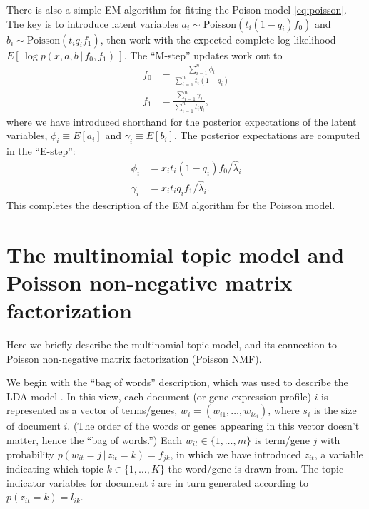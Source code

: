 \documentclass[final]{siamart171218}
\begin{document}
There is also a simple EM algorithm for fitting the Poison model
\eqref{eq:poisson}. The key is to introduce latent variables $a_i \sim
\mathrm{Poisson}(t_i (1-q_i) f_0)$ and $b_i \sim \mathrm{Poisson}(t_i
q_i f_1)$, then work with the expected complete log-likelihood $E[\,\log
  p(x, a, b \,|\, f_0, f_1)\,]$. The ``M-step'' updates work out to
\begin{align}
f_0 &= \frac{\sum_{i=1}^n \phi_i}{\sum_{i=1}^n t_i(1-q_i)} \\
f_1 &= \frac{\sum_{i=1}^n \gamma_i}{\sum_{i=1}^n t_i q_i},
\end{align}
where we have introduced shorthand for the posterior expectations of
the latent variables, $\phi_i \equiv E[a_i]$ and $\gamma_i \equiv
E[b_i]$. The posterior expectations are computed in the ``E-step'':
\begin{align}
\phi_i   &= x_i t_i (1 - q_i) f_0 / \hat{\lambda}_i \\
\gamma_i &= x_i t_i q_i f_1 / \hat{\lambda}_i.
\end{align}
This completes the description of the EM algorithm for the Poisson
model.

\section{The multinomial topic model and Poisson non-negative matrix
  factorization}

Here we briefly describe the multinomial topic model, and its
connection to Poisson non-negative matrix factorization (Poisson NMF).

We begin with the ``bag of words'' description, which was used to
describe the LDA model \cite{blei-2003}. In this view, each document
(or gene expression profile) $i$ is represented as a vector of
terms/genes, $w_i = (w_{i1}, \ldots, w_{is_i})$, where $s_i$ is the
size of document $i$. (The order of the words or genes appearing in
this vector doesn't matter, hence the ``bag of words.'') Each $w_{it}
\in \{1, \ldots, m\}$ is term/gene $j$ with probability
$p(w_{it} = j \,|\, z_{it} = k) = f_{jk}$, in which we have introduced
$z_{it}$, a variable indicating which topic $k \in \{1, \ldots, K\}$
the word/gene is drawn from. The topic indicator variables for
document $i$ are in turn generated according to $p(z_{it} = k) =
l_{ik}$.
\end{document}
